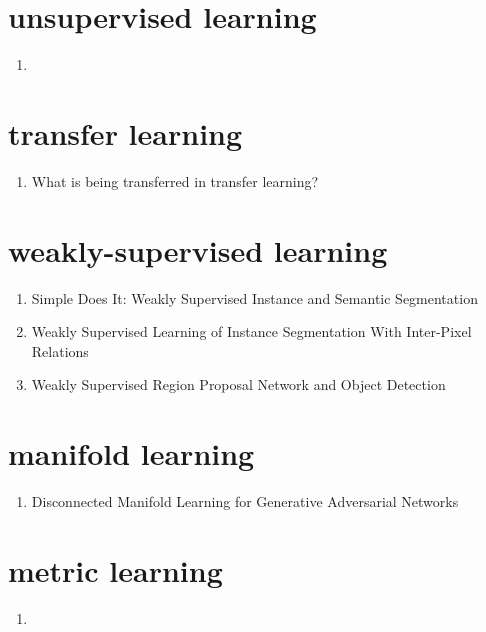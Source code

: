 \documentclass[acmlarge]{acmart}
\begin{document}
\section{unsupervised learning}
\begin{enumerate}
	\item
\end{enumerate}
\section{transfer learning}
\begin{enumerate}
	\item What is being transferred in transfer learning? \cite{Neyshabur2020WhatIB} 

\end{enumerate}
\section{weakly-supervised learning}
\begin{enumerate}
	\item Simple Does It: Weakly Supervised Instance and Semantic Segmentation \cite{Khoreva2017SimpleDI} 

	\item Weakly Supervised Learning of Instance Segmentation With Inter-Pixel Relations \cite{Ahn2019WeaklySL} 

	\item Weakly Supervised Region Proposal Network and Object Detection \cite{Tang2018WeaklySR} 

\end{enumerate}
\section{manifold learning}
\begin{enumerate}
	\item Disconnected Manifold Learning for Generative Adversarial Networks \cite{Khayatkhoei2018DisconnectedML} 

\end{enumerate}
\section{metric learning}
\begin{enumerate}
	\item
\end{enumerate}
\end{document}
